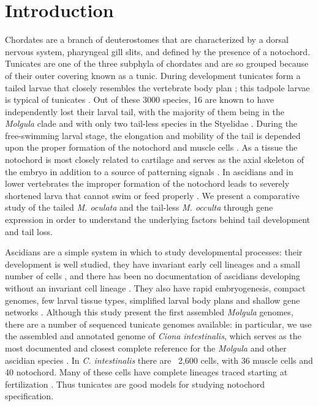 \chapter{Introduction}
Chordates are a branch of deuterostomes that are characterized by a dorsal nervous system, pharyngeal gill slits, and defined by the presence of a notochord. Tunicates are one of the three subphyla of chordates and are so grouped because of their outer covering known as a tunic. During development tunicates form a tailed larvae that closely resembles the vertebrate body plan \cite{jeffery_minireview_2002}; this tadpole larvae is typical of  tunicates \cite{huber_evolution_2000}. Out of these 3000 species, 16 are known to have independently lost their larval tail, with the majority of them being in the \textit{Molgula} clade \cite{berrill_studies_1931,swalla_interspecific_1990} and with only two tail-less species in the Styelidae \cite{huber_evolution_2000}. During the free-swimming larval stage, the elongation and mobility of the tail is depended upon the proper formation of the notochord and muscle cells \cite{satoh_ascidian_2003}. As a tissue the notochord is most closely related to cartilage and serves as the axial skeleton of the embryo in addition to a source of patterning signals \cite{jeffery_evolution_1999}. In ascidians and in lower vertebrates the improper formation of the notochord leads to severely shortened larva that cannot swim or feed properly \cite{di_gregorio_tail_2002,jiang_ascidian_2005,stemple_structure_2005}.
We present a comparative study of the tailed \textit{M. oculata} and the tail-less \textit{M. occulta} through gene expression in order to understand the underlying factors behind tail development and tail loss.

Ascidians are a simple system in which to study developmental processes: their development is well studied, they have invariant early cell lineages and a small number of cells \cite{lemaire_evolutionary_2011}, and there has been no documentation of ascidians developing without an invariant cell lineage \cite{lemaire_ascidians_2008}. They also have rapid embryogenesis, compact genomes, few larval tissue types, simplified larval body plans and shallow gene networks \cite{corbo_characterization_1997,jeffery_minireview_2002,dehal_draft_2002}. Although this study present the first assembled \textit{Molgula} genomes, there are a number of sequenced tunicate genomes available: in particular, we use the assembled and annotated genome of \textit{Ciona intestinalis}, which serves as the most documented and closest complete reference for the \textit{Molgula} and other ascidian species \cite{dehal_draft_2002,satoh_ascidian_2003,satoh_ciona_2003}. In \textit{C. intestinalis} there are ~2,600 cells, with 36 muscle cells and 40 notochord.  Many of these cells have complete lineages traced starting at fertilization \cite{nishida_cell_1983}. Thus tunicates are good models for studying notochord specification.

